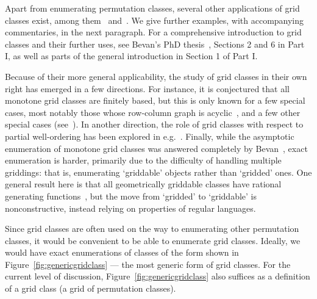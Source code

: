 \documentclass[12pt, a4paper, twoside]{report}
\begin{document}
Apart from enumerating permutation classes, several other applications of grid classes exist, among them~\cite{albert2011enumeration} and~\cite{bevan-new}. We give further examples, with accompanying commentaries, in the next paragraph. For a comprehensive introduction to grid classes and their further uses, see Bevan's PhD thesis~\cite{bevan2015thesis}, Sections 2 and 6 in Part I, as well as parts of the general introduction in Section 1 of Part I.

Because of their more general applicability, the study of grid classes in their own right has emerged in a few directions. For instance, it is conjectured that all monotone grid classes are finitely based, but this is only known for a few special cases, most notably those whose row-column graph is acyclic~\cite{aabrv2013}, and a few other special cases (see~\cite{albert-brignall-2times2, atkinson1997restricted, waton, bevan2015thesis}). In another direction, the role of grid classes with respect to partial well-ordering has been explored in e.g.~\cite{brignall2012pwo, murphy2003pwo, vatter2011pwo}. Finally, while the asymptotic enumeration of monotone grid classes was answered completely by Bevan~\cite{bevan15growth-rates}, exact enumeration is harder, primarily due to the difficulty of handling multiple griddings: that is, enumerating `griddable' objects rather than `gridded' ones. One general result here is that all geometrically griddable classes have rational generating functions~\cite{aabrv2013}, but the move from `gridded' to `griddable' is nonconstructive, instead relying on properties of regular languages.

Since grid classes are often used on the way to enumerating other permutation classes, it would be convenient to be able to enumerate grid classes. Ideally, we would have exact enumerations of classes of the form shown in Figure~\ref{fig:genericgridclass} --- the most generic form of grid classes. For the current level of discussion, Figure~\ref{fig:genericgridclass} also suffices as a definition of a grid class (a grid of permutation classes).
\end{document}
